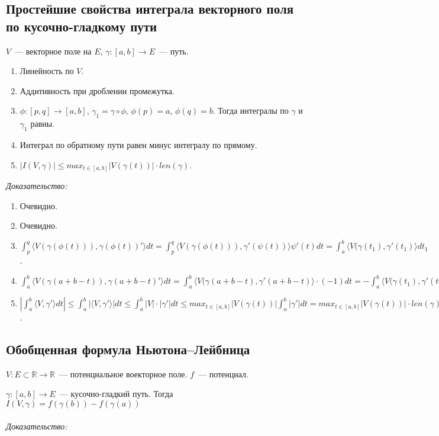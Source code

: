 \documentclass[paper=a4, fontsize=11pt]{article}
\begin{document}
\subsection{Простейшие свойства интеграла векторного поля по кусочно-гладкому пути}
$V$~--- векторное поле на $E$, $\gamma:[a,b] \rightarrow E$~--- путь.
\begin{enumerate}
    \item Линейность по $V$.
    \item Аддитивность при дроблении промежутка.
    \item $\phi:[p,q] \rightarrow [a,b]$, $\gamma_1 = \gamma \circ \phi$, $\phi(p)=a$, $\phi(q)=b$.
    Тогда интегралы по $\gamma$ и $\gamma_1$ равны.
    \item Интеграл по обратному пути равен минус интегралу по прямому.
    \item $|I(V,\gamma)| \leq max_{t \in [a,b]} |V(\gamma(t))| \cdot len(\gamma)$.
\end{enumerate}

\emph{Доказательство:}
\begin{enumerate}
    \item Очевидно.
    \item Очевидно.
    \item $\int_p^q \langle V(\gamma(\phi(t))),\gamma(\phi(t))' \rangle dt =
    \int_p^q \langle V(\gamma(\phi(t))),\gamma'(\psi(t)) \rangle \psi'(t)dt
     = \int_a^b \langle V(\gamma(t_1),\gamma'(t_1) \rangle dt_1$.
    \item $\int_a^b \langle V(\gamma(a+b-t)),\gamma(a+b-t)' \rangle dt =
    \int_a^b \langle V(\gamma(a+b-t),\gamma'(a+b-t) \rangle \cdot(-1)dt =
    -\int_a^b \langle V(\gamma(t_1),\gamma'(t_1) \rangle dt_1$
    \item $|\int_a^b \langle V,\gamma' \rangle dt| \leq \int_a^b |\langle V,\gamma' \rangle| dt \leq
    \int_a^b |V|\cdot|\gamma'| dt \leq max_{t \in [a,b]} |V(\gamma(t))| \int_a^b |\gamma'|dt = 
    max_{t \in [a,b]} |V(\gamma(t))| \cdot len(\gamma)$.
\end{enumerate}

\subsection{Обобщенная формула Ньютона--Лейбница}
$V: E \subset \mathds{R} \rightarrow \mathds{R}$~--- потенциальное воекторное поле. $f$~--- потенциал.

$\gamma:[a,b] \rightarrow E$~--- кусочно-гладкий путь. Тогда $I(V, \gamma) = f(\gamma(b)) - f(\gamma(a))$
\\\\
\emph{Доказательство:}
\end{document}
